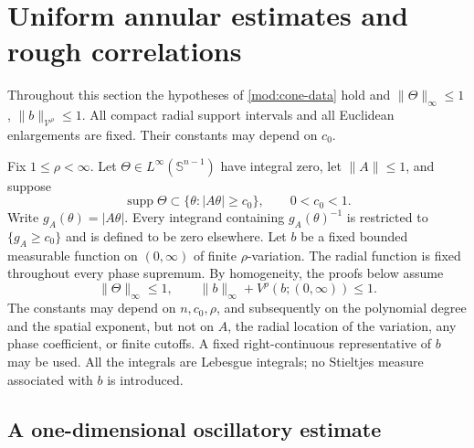 \documentclass[11pt]{article}
\numberwithin{equation}{section}
\theoremstyle{remark}
\theoremstyle{definition}
\begin{document}
\section{Uniform annular estimates and rough correlations}\label{mod:sec-analysis}
Throughout this section the hypotheses of \eqref{mod:cone-data} hold and
$\|\Theta\|_\infty\le1$, $\|b\|_{\mathcal V^\rho}\le1$.
All compact radial support intervals and all
Euclidean enlargements are fixed. Their constants may depend on $c_0$.


Fix $1\le\rho<\infty$. Let $\Theta\in L^\infty(\mathbb S^{n-1})$ have
integral zero, let $\|A\|\le1$, and suppose
\[
 \operatorname{supp}\Theta\subset\{\theta:|A\theta|\ge c_0\},
 \qquad 0<c_0<1.
\]
Write $g_A(\theta)=|A\theta|$. Every integrand containing
$g_A(\theta)^{-1}$ is restricted to $\{g_A\ge c_0\}$ and is
defined to be zero elsewhere. Let $b$ be a fixed bounded measurable
function on $(0,\infty)$ of finite $\rho$-variation. The radial function
is fixed throughout every phase supremum. By homogeneity, the proofs
below assume
\[
 \|\Theta\|_\infty\le1,
 \qquad \|b\|_\infty+V^\rho(b;(0,\infty))\le1.
\]
The constants may depend on $n,c_0,\rho$, and subsequently on the
polynomial degree and the spatial exponent, but not on $A$, the radial
location of the variation, any phase coefficient, or finite cutoffs.
A fixed right-continuous representative of $b$ may be used. All the
integrals are Lebesgue integrals; no Stieltjes measure associated with
$b$ is introduced.

\subsection{A one-dimensional oscillatory estimate}
\end{document}
